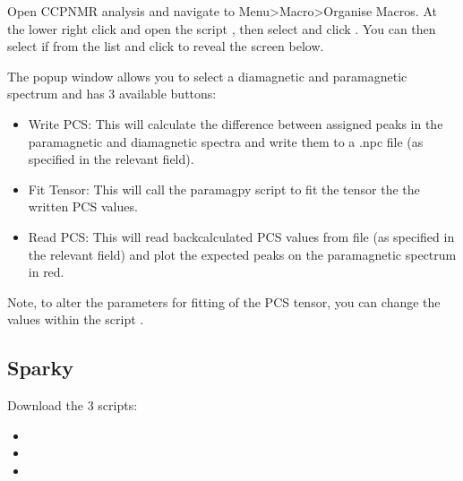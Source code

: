 \documentclass[a4paper,10pt,english,openany,oneside]{sphinxmanual}
\begin{document}
\sphinxAtStartPar
Open CCPNMR analysis and navigate to Menu\sphinxhyphen{}\textgreater{}Macro\sphinxhyphen{}\textgreater{}Organise Macros. At the lower right click  and open the script , then select  and click . You can then select if from the list and click  to reveal the screen below.

\noindent{}

\sphinxAtStartPar
The popup window allows you to select a diamagnetic and paramagnetic spectrum and has 3 available buttons:
\begin{itemize}
\item {} 
\sphinxAtStartPar
Write PCS: This will calculate the difference between assigned peaks in the paramagnetic and diamagnetic spectra and write them to a .npc file (as specified in the relevant field).

\item {} 
\sphinxAtStartPar
Fit Tensor: This will call the paramagpy script  to fit the tensor the the written PCS values.

\item {} 
\sphinxAtStartPar
Read PCS: This will read back\sphinxhyphen{}calculated PCS values from file (as specified in the relevant field) and plot the expected peaks on the paramagnetic spectrum in red.

\end{itemize}

\sphinxAtStartPar
Note, to alter the parameters for fitting of the PCS tensor, you can change the values within the script .


\subsection{Sparky}
\label{\detokenize{nmr_software_macros/index:sparky}}
\sphinxAtStartPar
Download the 3 scripts:
\begin{itemize}
\item {} 
\sphinxAtStartPar
{}

\item {} 
\sphinxAtStartPar
{}

\item {} 
\sphinxAtStartPar
{}

\end{itemize}
\end{document}
